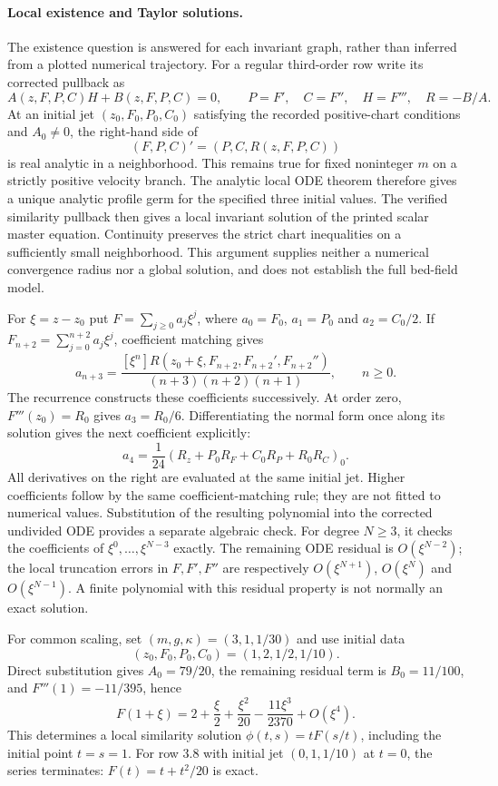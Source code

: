 \paragraph{Local existence and Taylor solutions.}
The existence question is answered for each invariant graph, rather than
inferred from a plotted numerical trajectory. For a regular third-order row
write its corrected pullback as
\[
 A(z,F,P,C)H+B(z,F,P,C)=0,\qquad
 P=F',\quad C=F'',\quad H=F''',\quad R=-B/A.
\]
At an initial jet $(z_0,F_0,P_0,C_0)$ satisfying the recorded positive-chart
conditions and $A_0\ne0$, the right-hand side of
\[
 (F,P,C)'=(P,C,R(z,F,P,C))
\]
is real analytic in a neighborhood. This remains true for fixed noninteger
$m$ on a strictly positive velocity branch. The analytic local ODE theorem
\cite[Section~4.1]{teschl2012}
therefore gives a unique analytic profile germ for the specified three
initial values. The verified similarity pullback then gives a local invariant
solution of the printed scalar master equation. Continuity preserves the
strict chart inequalities on a sufficiently small neighborhood. This
argument supplies neither a numerical convergence radius nor a global
solution, and does not establish the full bed-field model.

For $\xi=z-z_0$ put $F=\sum_{j\geq0}a_j\xi^j$, where
$a_0=F_0$, $a_1=P_0$ and $a_2=C_0/2$. If
$F_{n+2}=\sum_{j=0}^{n+2}a_j\xi^j$, coefficient matching gives
\begin{equation}
 a_{n+3}=
 \frac{[\xi^n]R(z_0+\xi,F_{n+2},F_{n+2}',F_{n+2}'')}
 {(n+3)(n+2)(n+1)},\qquad n\geq0.
 \label{eq:sve-series-recurrence}
\end{equation}
The recurrence constructs these coefficients successively. At order zero,
$F'''(z_0)=R_0$ gives $a_3=R_0/6$. Differentiating the normal form once
along its solution gives the next coefficient explicitly:
\[
 a_4=\frac1{24}\left(R_z+P_0R_F+C_0R_P+R_0R_C\right)_0.
\]
All derivatives on the right are evaluated at the same initial jet. Higher
coefficients follow by the same coefficient-matching rule; they are not
fitted to numerical values. Substitution of the resulting polynomial into
the corrected undivided ODE provides a separate algebraic check. For degree $N\geq3$, it checks the coefficients of
$\xi^0,\ldots,\xi^{N-3}$ exactly. The remaining ODE residual is
$O(\xi^{N-2})$; the local truncation errors in $F,F',F''$ are respectively
$O(\xi^{N+1})$, $O(\xi^N)$ and $O(\xi^{N-1})$. A finite polynomial with
this residual property is not normally an exact solution.

For common scaling, set $(m,g,\kappa)=(3,1,1/30)$ and use initial data
\[
 (z_0,F_0,P_0,C_0)=(1,2,1/2,1/10).
\]
Direct substitution gives
$A_0=79/20$, the remaining residual term is $B_0=11/100$, and $F'''(1)=-11/395$, hence
\[
 F(1+\xi)=2+\frac{\xi}{2}+\frac{\xi^2}{20}
             -\frac{11\xi^3}{2370}+O(\xi^4).
\]
This determines a local similarity solution $\phi(t,s)=tF(s/t)$, including
the initial point $t=s=1$. For row 3.8 with initial jet $(0,1,1/10)$ at
$t=0$, the series terminates: $F(t)=t+t^2/20$ is exact.


